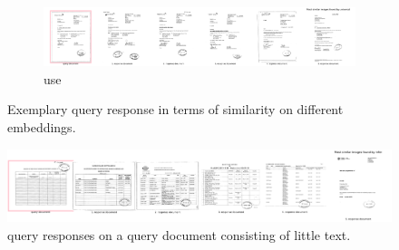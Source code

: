 \begin{figure}[h!]
    \begin{subfigure}{\textwidth}
        \centering
        \includegraphics[width=1\textwidth]{images/query_results/4b4d0a9ee0c7283e5bfd69c402c73b2140bf90351c8f44d6809afe23c6dfaa50/Most_similar_images_found_by_universal.pdf}
        \caption{\ac{use}}
        \label{fig:query_resp_use}
    \end{subfigure}
\caption[Exemplary query response]{Exemplary query response in terms of similarity on different embeddings.}
\label{fig:query_resp}
\end{figure}

\begin{figure}[htp] %
    \centering
    \includegraphics[width=1\textwidth]{images/query_results/42b7e56855c88c22ed01f381167e6f0887815e1ef7ea6b149be06ee1f8557b9e/Most_similar_images_found_by_infer.pdf}
    \caption[\infersent{} query responses]{\infersent{} query responses on a query document consisting of little text.
    }
    \label{fig:good_query_resp_infer}
\end{figure}

